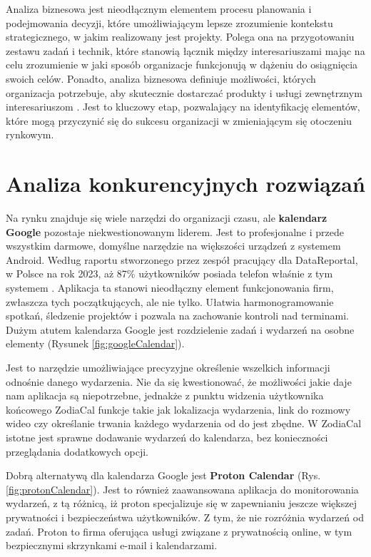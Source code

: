 \phantom{Th}
Analiza biznesowa jest nieodłącznym elementem procesu planowania i podejmowania decyzji, które umożliwiającym lepsze zrozumienie kontekstu strategicznego, w jakim realizowany jest projekty. Polega ona na przygotowaniu zestawu zadań i technik, które stanowią łącznik między interesariuszami mając na celu zrozumienie w jaki sposób organizacje funkcjonują w dążeniu do osiągnięcia swoich celów. Ponadto, analiza biznesowa definiuje możliwości, których organizacja potrzebuje, aby skutecznie dostarczać produkty i usługi zewnętrznym interesariuszom \cite{businessanalysis}. Jest to kluczowy etap, pozwalający na identyfikację elementów, które mogą przyczynić się do sukcesu organizacji w zmieniającym się otoczeniu rynkowym.

\section{Analiza konkurencyjnych rozwiązań}

\phantom{Th}Na rynku znajduje się wiele narzędzi do organizacji czasu, ale \textbf{kalendarz Google} pozostaje niekwestionowanym liderem.
Jest to profesjonalne i przede wszystkim darmowe, domyślne narzędzie na większości urządzeń z systemem Android.
Według raportu stworzonego przez zespół pracujący dla DataReportal, w Polsce na rok 2023, aż 87\% użytkowników posiada
telefon właśnie z tym systemem
\cite{datareportal}. Aplikacja ta stanowi nieodłączny element funkcjonowania firm, zwłaszcza tych początkujących,
ale nie tylko. Ułatwia harmonogramowanie spotkań, śledzenie projektów i pozwala na zachowanie kontroli nad terminami.
Dużym atutem kalendarza Google jest rozdzielenie zadań i wydarzeń na osobne elementy (Rysunek \ref{fig:googleCalendar}).

Jest to narzędzie umożliwiające precyzyjne określenie wszelkich informacji odnośnie danego wydarzenia.
Nie da się kwestionować, że możliwości jakie daje nam aplikacja są niepotrzebne,
jednakże z punktu widzenia użytkownika końcowego ZodiaCal funkcje takie jak lokalizacja wydarzenia,
link do rozmowy wideo czy określanie trwania każdego wydarzenia od do jest zbędne.
W ZodiaCal istotne jest sprawne dodawanie wydarzeń do kalendarza, bez konieczności przeglądania dodatkowych opcji.

Dobrą alternatywą dla kalendarza Google jest \textbf{Proton Calendar} (Rys. \ref{fig:protonCalendar}).
Jest to również zaawansowana aplikacja do monitorowania wydarzeń, z tą różnicą,
iż proton specjalizuje się w zapewnianiu jeszcze większej prywatności i bezpieczeństwa użytkowników.
Z tym, że nie rozróżnia wydarzeń od zadań. Proton to firma oferująca usługi związane
z prywatnością online, w tym bezpiecznymi skrzynkami e-mail i kalendarzami.

